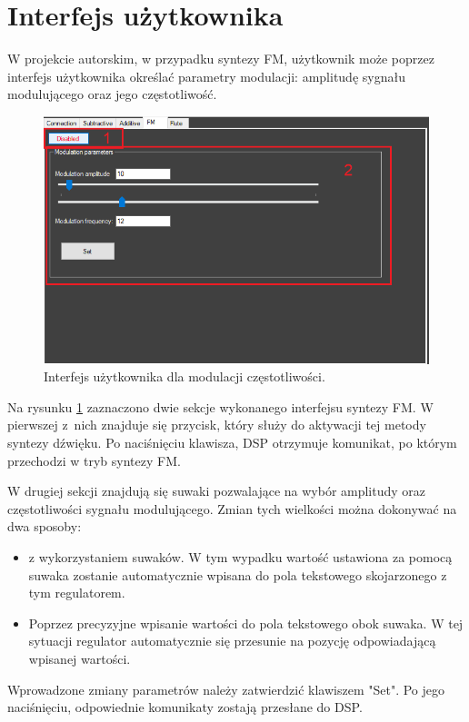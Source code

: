 \section{Interfejs użytkownika}
W projekcie autorskim, w przypadku syntezy FM, użytkownik może poprzez interfejs użytkownika określać parametry modulacji: amplitudę sygnału modulującego oraz jego częstotliwość.
\begin{figure}[H]
	\centering
	\includegraphics[width=12cm]{grafiki/fm_interface}
	\captionsetup{justification=centering}
	\caption{Interfejs użytkownika dla modulacji częstotliwości.}
	\label{rys:fm_interface}
\end{figure}
Na rysunku \ref{rys:fm_interface} zaznaczono dwie sekcje wykonanego interfejsu syntezy FM. W pierwszej z~nich znajduje się przycisk, który służy do aktywacji tej metody syntezy dźwięku. Po naciśnięciu klawisza, DSP otrzymuje komunikat, po którym przechodzi w tryb syntezy FM.

W drugiej sekcji znajdują się suwaki pozwalające na wybór amplitudy oraz częstotliwości sygnału modulującego. Zmian tych wielkości można dokonywać na dwa sposoby:
\begin{itemize}
	\item z wykorzystaniem suwaków. W tym wypadku wartość ustawiona za pomocą suwaka zostanie automatycznie wpisana do pola tekstowego skojarzonego z tym regulatorem.
	\item Poprzez precyzyjne wpisanie wartości do pola tekstowego obok suwaka. W tej sytuacji regulator automatycznie się przesunie na pozycję odpowiadającą wpisanej wartości.
\end{itemize}
Wprowadzone zmiany parametrów należy zatwierdzić klawiszem "Set". Po jego naciśnięciu, odpowiednie komunikaty zostają przesłane do DSP.
